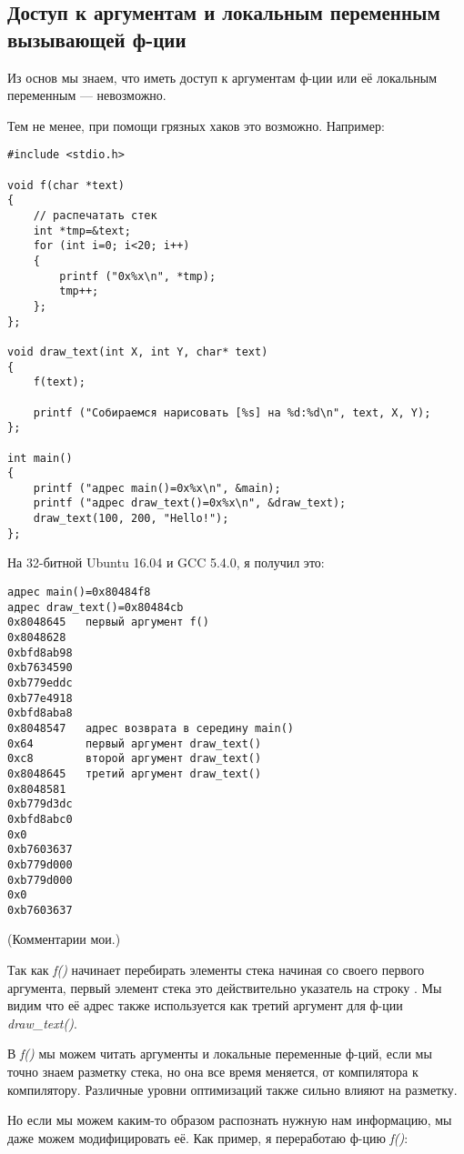\subsection{Доступ к аргументам и локальным переменным вызывающей ф-ции}

Из основ \CCpp мы знаем, что иметь доступ к аргументам ф-ции или её локальным переменным --- невозможно.

Тем не менее, при помощи грязных хаков это возможно.
Например:

\begin{lstlisting}[style=customc]
#include <stdio.h>

void f(char *text)
{
	// распечатать стек
	int *tmp=&text;
	for (int i=0; i<20; i++)
	{
		printf ("0x%x\n", *tmp);
		tmp++;
	};
};

void draw_text(int X, int Y, char* text)
{
	f(text);

	printf ("Собираемся нарисовать [%s] на %d:%d\n", text, X, Y);
};

int main()
{
	printf ("адрес main()=0x%x\n", &main);
	printf ("адрес draw_text()=0x%x\n", &draw_text);
	draw_text(100, 200, "Hello!");
};
\end{lstlisting}

На 32-битной Ubuntu 16.04 и GCC 5.4.0, я получил это:

\begin{lstlisting}
адрес main()=0x80484f8
адрес draw_text()=0x80484cb
0x8048645	первый аргумент f()
0x8048628
0xbfd8ab98
0xb7634590
0xb779eddc
0xb77e4918
0xbfd8aba8
0x8048547	адрес возврата в середину main()
0x64		первый аргумент draw_text()
0xc8		второй аргумент draw_text()
0x8048645	третий аргумент draw_text()
0x8048581
0xb779d3dc
0xbfd8abc0
0x0
0xb7603637
0xb779d000
0xb779d000
0x0
0xb7603637
\end{lstlisting}

(Комментарии мои.)

Так как \emph{f()} начинает перебирать элементы стека начиная со своего первого аргумента, первый элемент стека это
действительно указатель на строку .
Мы видим что её адрес также используется как третий аргумент для ф-ции \emph{draw\_text()}.

В \emph{f()} мы можем читать аргументы и локальные переменные ф-ций, если мы точно знаем разметку стека, но она все время
меняется, от компилятора к компилятору.
Различные уровни оптимизаций также сильно влияют на разметку.

Но если мы можем каким-то образом распознать нужную нам информацию, мы даже можем модифицировать её.
Как пример, я переработаю ф-цию \emph{f()}:

